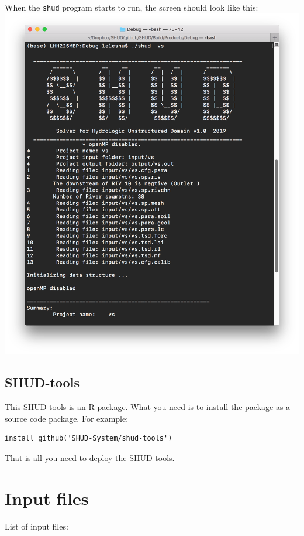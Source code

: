 \documentclass[]{scrbook}
\begin{document}
When the \texttt{shud} program starts to run, the screen should look
like this: \includegraphics{Fig/CLI_vs.png}

\section{SHUD-tools}\label{shud-tools}

This SHUD-tools is an R package. What you need is to install the package
as a source code package. For example:

\begin{verbatim}
install_github('SHUD-System/shud-tools')
\end{verbatim}

That is all you need to deploy the SHUD-tools.

\chapter{Input files}\label{input-files}

List of input files:
\end{document}
